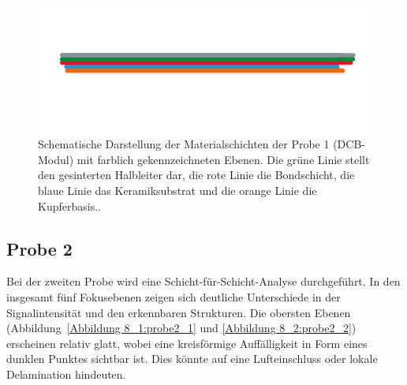 \begin{figure}[htbp]
    \centering
    \includegraphics[scale=0.75]{Bilder/probelinie1}
    \caption{Schematische Darstellung der Materialschichten der Probe 1 (DCB-Modul) mit farblich gekennzeichneten Ebenen. Die grüne Linie stellt den gesinterten Halbleiter dar, die rote Linie die Bondschicht, die blaue Linie das Keramiksubstrat und die orange Linie die Kupferbasis..}
    \label{Abbildung 7 :Schematische Darstellung der Materialschichten der Probe 1 (DCB-Modul) mit farblich gekennzeichneten Ebenen. Die grüne Linie stellt den gesinterten Halbleiter dar, die rote Linie die Bondschicht, die blaue Linie das Keramiksubstrat und die orange Linie die Kupferbasis.}
\end{figure}
\vspace{0.5cm}
\subsection{Probe 2}
Bei der zweiten Probe wird eine Schicht-für-Schicht-Analyse durchgeführt. In den insgesamt fünf Fokusebenen zeigen sich deutliche Unterschiede in der Signalintensität und den erkennbaren Strukturen. Die obersten Ebenen (Abbildung~\ref{Abbildung 8_1:probe2_1} und \ref{Abbildung 8_2:probe2_2}) erscheinen relativ glatt, wobei eine kreisförmige Auffälligkeit in Form eines dunklen Punktes sichtbar ist. Dies könnte auf eine Lufteinschluss oder lokale Delamination hindeuten.

